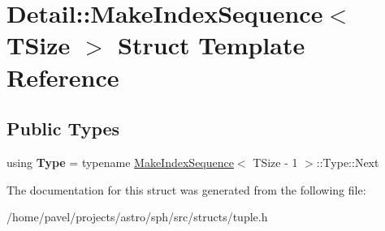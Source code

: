 \hypertarget{structDetail_1_1MakeIndexSequence}{}\section{Detail\+:\+:Make\+Index\+Sequence$<$ T\+Size $>$ Struct Template Reference}
\label{structDetail_1_1MakeIndexSequence}
\subsection*{Public Types}
\begin{DoxyCompactItemize}
\item 
\hypertarget{structDetail_1_1MakeIndexSequence_a553501b697fa906c92922190d3658342}{}\label{structDetail_1_1MakeIndexSequence_a553501b697fa906c92922190d3658342} 
using {\bfseries Type} = typename \hyperlink{structDetail_1_1MakeIndexSequence}{Make\+Index\+Sequence}$<$ T\+Size -\/ 1 $>$\+::Type\+::\+Next
\end{DoxyCompactItemize}


The documentation for this struct was generated from the following file\+:\begin{DoxyCompactItemize}
\item 
/home/pavel/projects/astro/sph/src/structs/tuple.\+h\end{DoxyCompactItemize}
